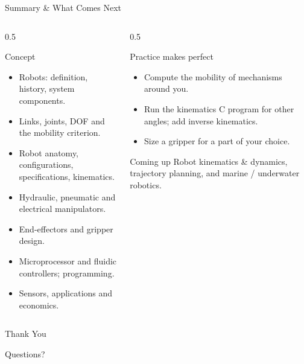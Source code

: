 \documentclass[aspectratio=169]{beamer}
\begin{document}
	\begin{frame}{Summary \& What Comes Next}
		\begin{columns}[T]
			\begin{column}{0.5\textwidth}
				\begin{block}{Concept}
					\begin{itemize}\small
						\item Robots: definition, history, system components.
						\item Links, joints, DOF and the mobility criterion.
						\item Robot anatomy, configurations, specifications, kinematics.
						\item Hydraulic, pneumatic and electrical manipulators.
						\item End-effectors and gripper design.
						\item Microprocessor and fluidic controllers; programming.
						\item Sensors, applications and economics.
					\end{itemize}
				\end{block}
			\end{column}
			\begin{column}{0.5\textwidth}
				\begin{block}{Practice makes perfect}
					\begin{itemize}\small
						\item Compute the mobility of mechanisms around you.
						\item Run the kinematics C program for other angles; add inverse kinematics.
						\item Size a gripper for a part of your choice.
					\end{itemize}
				\end{block}
				\begin{block}{Coming up}
					\small Robot kinematics \& dynamics, trajectory planning, and marine / underwater robotics.
				\end{block}
			\end{column}
		\end{columns}
	\end{frame}

	\begin{frame}
		\centering
		\Huge Thank You
		\vspace{0.5cm}

		\normalsize Questions?
	\end{frame}

\end{document}
